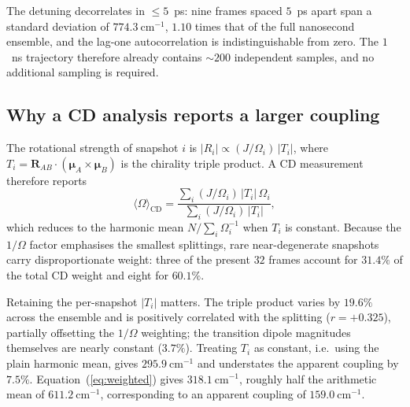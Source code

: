 \documentclass[journal=jpcbfk, manuscript=article, layout=twocolumn, doi=true]{achemso}
\begin{document}
The detuning decorrelates in $\le 5$~ps: nine frames spaced $5$~ps apart span
a standard deviation of $774.3~\mathrm{cm^{-1}}$, $1.10$ times that of the full
nanosecond ensemble, and the lag-one autocorrelation is indistinguishable from
zero. The $1$~ns trajectory therefore already contains $\sim\!200$ independent
samples, and no additional sampling is required.

\subsection{Why a CD analysis reports a larger coupling}

The rotational strength of snapshot $i$ is
$|R_i| \propto (J/\Omega_i)\,|T_i|$, where
$T_i = \mathbf{R}_{AB}\cdot(\bm\mu_{A}\times\bm\mu_{B})$ is the chirality
triple product. A CD measurement therefore reports
\begin{equation}
\langle\Omega\rangle_{\mathrm{CD}}
= \frac{\sum_i (J/\Omega_i)\,|T_i|\,\Omega_i}{\sum_i (J/\Omega_i)\,|T_i|} ,
\label{eq:weighted}
\end{equation}
which reduces to the harmonic mean $N/\sum_i \Omega_i^{-1}$ when $T_i$ is
constant. Because the $1/\Omega$ factor emphasises the smallest splittings,
rare near-degenerate snapshots carry disproportionate weight: three of the
present $32$ frames account for $31.4\%$ of the total CD weight and eight for
$60.1\%$.

Retaining the per-snapshot $|T_i|$ matters. The triple product varies by
$19.6\%$ across the ensemble and is positively correlated with the splitting
($r = +0.325$), partially offsetting the $1/\Omega$ weighting; the transition
dipole magnitudes themselves are nearly constant ($3.7\%$). Treating $T_i$ as
constant, i.e.\ using the plain harmonic mean, gives
$295.9~\mathrm{cm^{-1}}$ and understates the apparent coupling by $7.5\%$.
Equation~(\ref{eq:weighted}) gives $318.1~\mathrm{cm^{-1}}$, roughly half the
arithmetic mean of $611.2~\mathrm{cm^{-1}}$, corresponding to an apparent
coupling of $159.0~\mathrm{cm^{-1}}$.
\end{document}
